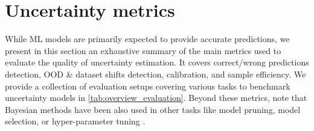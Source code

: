 
\section{Uncertainty metrics}
\label{sec:background-experiments}

While ML models are primarily expected to provide accurate predictions, we present in this section an exhaustive summary of the main metrics used to evaluate the quality of uncertainty estimation. 
It covers correct/wrong predictions detection, OOD \& dataset shifts detection, calibration, and sample efficiency.
We provide a collection of evaluation setups covering various tasks to benchmark uncertainty models in \cref{tab:overview_evaluation}. Beyond these metrics, note that Bayesian methods have been also used in other tasks like  model pruning, model selection, or hyper-parameter tuning \citep{bayesian-networks,daxberger2021laplace}.

